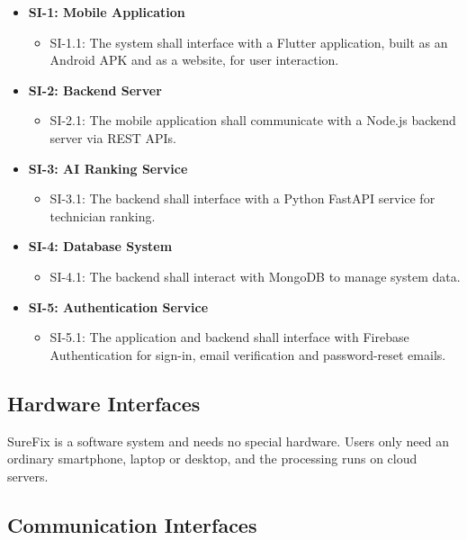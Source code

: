\documentclass[A4paper,12pt]{report}
\theoremstyle{plain}
\theoremstyle{definition}
\theoremstyle{remark}
\numberwithin{equation}{section}
\begin{document}
\begin{itemize}
    \item \textbf{SI-1: Mobile Application}  
    \begin{itemize}
                \item SI-1.1: The system shall interface with a Flutter application, built as an Android APK and as a website, for user interaction.
    \end{itemize}

    \item \textbf{SI-2: Backend Server}  
    \begin{itemize}
        \item SI-2.1: The mobile application shall communicate with a Node.js backend server via REST APIs.
    \end{itemize}

    \item \textbf{SI-3: AI Ranking Service}  
    \begin{itemize}
        \item SI-3.1: The backend shall interface with a Python FastAPI service for technician ranking.
    \end{itemize}

    \item \textbf{SI-4: Database System}  
    \begin{itemize}
                \item SI-4.1: The backend shall interact with MongoDB to manage system data.
    \end{itemize}

    \item \textbf{SI-5: Authentication Service}
    \begin{itemize}
        \item SI-5.1: The application and backend shall interface with Firebase Authentication for sign-in, email verification and password-reset emails.
    \end{itemize}
\end{itemize}

\subsection{Hardware Interfaces}

SureFix is a software system and needs no special hardware. Users only need an ordinary smartphone, laptop or desktop, and the processing runs on cloud servers.

\subsection{Communication Interfaces}
\end{document}
